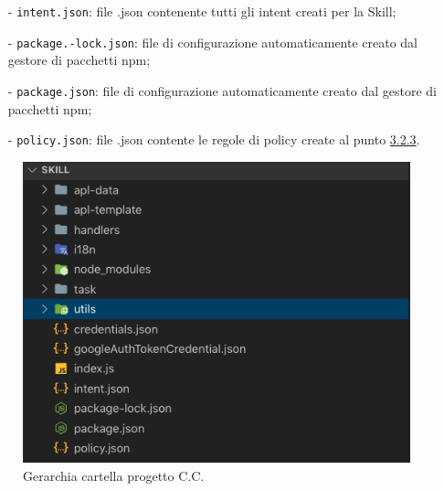 \begin{itemize}
\begin{itemize}
            \item[-] \texttt{intent.json}: file .json contenente tutti gli intent creati per la Skill;
            \item[-] \texttt{package.-lock.json}: file di configurazione automaticamente creato dal gestore di pacchetti npm;
            \item[-] \texttt{package.json}: file di configurazione automaticamente creato dal gestore di pacchetti npm;
            \item[-] \texttt{policy.json}: file .json contente le regole di policy create al punto \hyperref[aws-iam]{3.2.3}.
        \end{itemize}
    \end{itemize}
\begin{figure}[H]
	\includegraphics[width=13.2cm]{immagini/skill-folder.png}
	\caption{\label{fig:gerarchia_cartella_cc}Gerarchia cartella progetto C.C.}
\end{figure}

